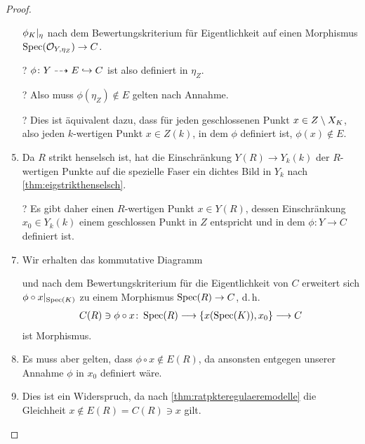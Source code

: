 \documentclass[german]{scrreprt}
\begin{document}
\begin{Lemma}
\begin{proof}
\begin{enumerate}
      $\phi_{K}|_{\eta}$ nach dem Bewertungskriterium für
      Eigentlichkeit auf einen Morphismus
      $\operatorname{Spec}(\mathcal{O}_{Y,\eta_Z})\to C$.
    \item[?] $\phi\colon Y\dashrightarrow E\hookrightarrow C$ ist also definiert in
      $\eta_Z$.
    \item[?] Also muss $\phi(\eta_Z)\not\in E$ gelten nach Annahme.
    \item[?] Dies ist äquivalent dazu, dass für jeden geschlossenen
      Punkt $x\in Z\setminus X_{K}$, also jeden $k$-wertigen Punkt
      $x\in Z(k)$, in dem $\phi$ definiert ist, $\phi(x)\not\in E$.
    \item Da $R$ strikt henselsch ist, hat die Einschränkung $Y(R)\to
      Y_k(k)$ der $R$-wertigen Punkte auf die spezielle Faser ein
      dichtes Bild in $Y_k$ nach \autoref{thm:eigstrikthenselsch}.
    \item[?] Es gibt daher einen $R$-wertigen Punkt $x\in Y(R)$,
      dessen Einschränkung $x_0\in Y_k(k)$ einem geschlossen Punkt in
      $Z$ entspricht und in dem $\phi\colon Y\to C$ definiert ist.
    \item Wir erhalten das kommutative Diagramm
      \begin{center}
      \end{center}
      und nach dem Bewertungskriterium für die Eigentlichkeit von $C$
      erweitert sich $\phi\circ x|_{\operatorname{Spec}(K)}$ zu einem Morphismus
      $\operatorname{Spec}(R)\to C$, d.\,h.
      \begin{gather*}
        C(R)\ni\phi\circ x\colon
        \operatorname{Spec}(R) \longrightarrow \left\{ x(\operatorname{Spec}(K)), x_0 \right\}
        \longrightarrow C
      \end{gather*}
      ist Morphismus.
    \item Es muss aber gelten, dass $\phi\circ x\not\in E(R)$, da
      ansonsten entgegen unserer Annahme $\phi$ in $x_0$ definiert
      wäre.
    \item Dies ist ein Widerspruch, da nach
      \autoref{thm:ratpkteregulaeremodelle} die Gleichheit
      $x\not\in E(R)=C(R)\ni x$ gilt.
    \end{enumerate}
  \end{proof}
\end{Lemma}
\end{document}
